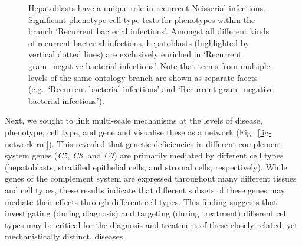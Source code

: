 \documentclass[
]{agujournal2019}
\begin{document}
\label{cell-fig-rni}
\begin{figure}[H]


\caption{\label{fig-rni}Hepatoblasts have a unique role in recurrent
Neisserial infections. Significant phenotype-cell type tests for
phenotypes within the branch `Recurrent bacterial infections'. Amongst
all different kinds of recurrent bacterial infections, hepatoblasts
(highlighted by vertical dotted lines) are exclusively enriched in
`Recurrent gram−negative bacterial infections'. Note that terms from
multiple levels of the same ontology branch are shown as separate facets
(e.g.~`Recurrent bacterial infections' and `Recurrent gram−negative
bacterial infections').}

\end{figure}%

Next, we sought to link multi-scale mechanisms at the levels of disease,
phenotype, cell type, and gene and visualise these as a network
(Fig.~\ref{fig-network-rni}). This revealed that genetic deficiencies in
different complement system genes (\emph{C5}, \emph{C8}, and \emph{C7})
are primarily mediated by different cell types (hepatoblasts, stratified
epithelial cells, and stromal cells, respectively). While genes of the
complement system are expressed throughout many different tissues and
cell types, these results indicate that different subsets of these genes
may mediate their effects through different cell types. This finding
suggests that investigating (during diagnosis) and targeting (during
treatment) different cell types may be critical for the diagnosis and
treatment of these closely related, yet mechanistically distinct,
diseases.
\end{document}
